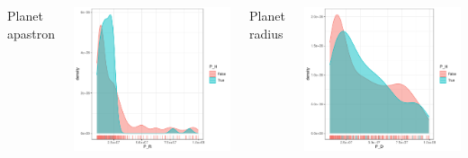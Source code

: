 \documentclass[compress]{beamer}
\begin{document}
\begin{frame}
\begin{columns}[t]
        \begin{center}
        Planet apastron\\
        \end{center}
        \includegraphics[width=\linewidth]{Pic/Density/P_R.pdf}
        \begin{center}
        Planet radius\\
        \end{center}
        \includegraphics[width=\linewidth]{Pic/Density/P_D.pdf}

\end{columns}
\end{frame}
\end{document}
